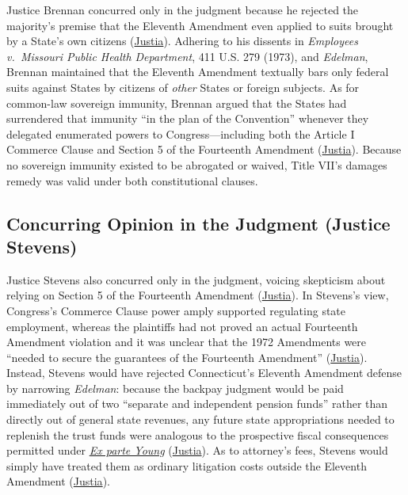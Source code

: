 \documentclass[12pt]{article}
\begin{document}
Justice Brennan concurred only in the judgment because he rejected the majority's premise that the Eleventh Amendment even applied to suits brought by a State's own citizens (\href{https://supreme.justia.com/cases/federal/us/427/445/}{Justia}). Adhering to his dissents in \textit{Employees v.\ Missouri Public Health Department}, 411 U.S. 279 (1973), and \textit{Edelman}, Brennan maintained that the Eleventh Amendment textually bars only federal suits against States by citizens of \emph{other} States or foreign subjects. As for common-law sovereign immunity, Brennan argued that the States had surrendered that immunity ``in the plan of the Convention'' whenever they delegated enumerated powers to Congress---including both the Article I Commerce Clause and Section 5 of the Fourteenth Amendment (\href{https://supreme.justia.com/cases/federal/us/427/445/}{Justia}). Because no sovereign immunity existed to be abrogated or waived, Title VII's damages remedy was valid under both constitutional clauses.

\subsection{Concurring Opinion in the Judgment (Justice Stevens)}

Justice Stevens also concurred only in the judgment, voicing skepticism about relying on Section 5 of the Fourteenth Amendment (\href{https://supreme.justia.com/cases/federal/us/427/445/}{Justia}). In Stevens's view, Congress's Commerce Clause power amply supported regulating state employment, whereas the plaintiffs had not proved an actual Fourteenth Amendment violation and it was unclear that the 1972 Amendments were ``needed to secure the guarantees of the Fourteenth Amendment'' (\href{https://supreme.justia.com/cases/federal/us/427/445/}{Justia}). Instead, Stevens would have rejected Connecticut's Eleventh Amendment defense by narrowing \textit{Edelman}: because the backpay judgment would be paid immediately out of two ``separate and independent pension funds'' rather than directly out of general state revenues, any future state appropriations needed to replenish the trust funds were analogous to the prospective fiscal consequences permitted under \href{https://supreme.justia.com/cases/federal/us/209/123/}{\textit{Ex parte Young}} (\href{https://supreme.justia.com/cases/federal/us/427/445/}{Justia}). As to attorney's fees, Stevens would simply have treated them as ordinary litigation costs outside the Eleventh Amendment (\href{https://supreme.justia.com/cases/federal/us/427/445/}{Justia}).
\end{document}
